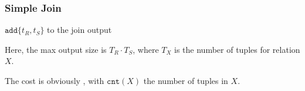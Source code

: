 \subsubsection{Simple Join}
\begin{algorithm}
    \caption{SimpleJoin Algorithm}
    \begin{algorithmic}[1]
                        \State $\texttt{add}\{ t_R, t_S \}$ to the join output
                    \EndIf
                \EndFor
            \EndFor
        \EndProcedure
    \end{algorithmic}
\end{algorithm}
Here, the max output size is $T_R \cdot T_S$, where $T_X$ is the number of tuples for relation $X$.

The cost is obviously , with $\texttt{cnt}(X)$ the number of tuples in $X$.
